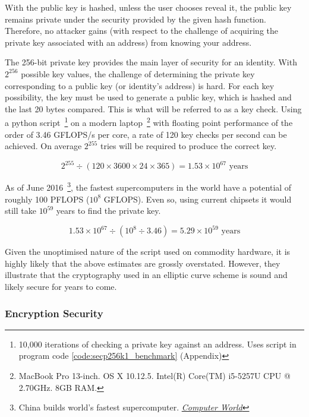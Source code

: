 With the public key is hashed, unless the user chooses reveal it, the public key remains private under the security provided by the given hash function. Therefore, no attacker gains (with respect to the challenge of acquiring the private key associated with an address) from knowing your address.

The 256-bit private key provides the main layer of security for an identity. With $2^{256}$ possible key values, the challenge of determining the private key corresponding to a public key (or identity's address) is hard. For each key possibility, the key must be used to generate a public key, which is hashed and the last 20 bytes compared. This is what will be referred to as a key check. Using a python script~\footnote{10,000 iterations of checking a private key against an address. Uses script in program code \ref{code:secp256k1_benchmark} (Appendix)} on a modern laptop~\footnote{MacBook Pro 13-inch. OS X 10.12.5. Intel(R) Core(TM) i5-5257U CPU @ 2.70GHz. 8GB RAM.} with floating point performance of the order of 3.46 GFLOPS/s per core, a rate of 120 key checks per second can be achieved. On average $2^{255}$ tries will be required to produce the correct key.

$$
2^{255} \div (120 \times 3600 \times 24 \times 365) = 1.53 \times 10^{67} \text{ years}
$$

As of June 2016~\footnote{China builds world's fastest supercomputer.  \href{http://www.computerworld.com/article/3085483/high-performance-computing/china-builds-world-s-fastest-supercomputer-without-u-s-chips.html}{\textit{Computer World}}}, the fastest supercomputers in the world have a potential of roughly 100 PFLOPS ($10^8$ GFLOPS). Even so, using current chipsets it would still take $10^{59}$ years to find the private key.

$$
1.53 \times 10^{67} \div (10^8 \div 3.46) = 5.29 \times 10^{59} \text{ years}
$$

Given the unoptimised nature of the script used on commodity hardware, it is highly likely that the above estimates are grossly overstated. However, they illustrate that the cryptography used in an elliptic curve scheme is sound and likely secure for years to come.

\subsubsection{Encryption Security}
